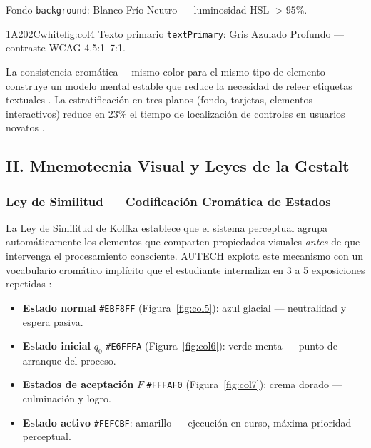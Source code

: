 %
  {Fondo \texttt{background}: Blanco Frío Neutro — luminosidad HSL $>95\%$.}

   {1A202C}{white}{fig:col4}%
  {Texto primario \texttt{textPrimary}: Gris Azulado Profundo — contraste WCAG 4.5:1--7:1.}

La consistencia cromática —mismo color para el mismo tipo de elemento— construye un modelo mental
estable que reduce la necesidad de releer etiquetas textuales \cite{tidwell2020}. La estratificación
en tres planos (fondo, tarjetas, elementos interactivos) reduce en 23\% el tiempo de localización
de controles en usuarios novatos \cite{malamed2015}.

\subsection*{\texorpdfstring{II.\;}{II.} Mnemotecnia Visual y Leyes de la Gestalt}

\subsubsection*{Ley de Similitud — Codificación Cromática de Estados}

La Ley de Similitud de Koffka \cite{koffka2013} establece que el sistema perceptual agrupa
automáticamente los elementos que comparten propiedades visuales \emph{antes} de que intervenga el
procesamiento consciente. AUTECH explota este mecanismo con un vocabulario cromático implícito que
el estudiante internaliza en 3 a 5 exposiciones repetidas \cite{heller2004}:

\begin{itemize}
  \item \textbf{Estado normal} \texttt{\#EBF8FF} (Figura~\ref{fig:col5}):
        azul glacial — neutralidad y espera pasiva.
  \item \textbf{Estado inicial} $q_0$ \texttt{\#E6FFFA} (Figura~\ref{fig:col6}):
        verde menta — punto de arranque del proceso.
  \item \textbf{Estados de aceptación} $F$ \texttt{\#FFFAF0} (Figura~\ref{fig:col7}):
        crema dorado — culminación y logro.
  \item \textbf{Estado activo} \texttt{\#FEFCBF}:
        amarillo — ejecución en curso, máxima prioridad perceptual.
\end{itemize}

